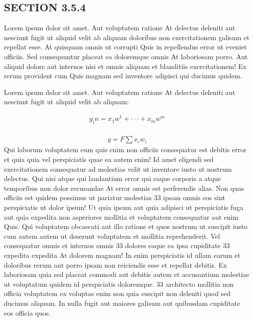 \documentclass[a4paper,12pt]{report}
\begin{document}
\subsection{SECTION 3.5.4}
\hspace{.5cm} Lorem ipsum dolor sit amet. Aut voluptatem ratione At delectus deleniti aut nesciunt fugit ut aliquid velit ab aliquam doloribus non exercitationem galisum et repellat esse. At quisquam omnis ut corrupti Quis in repellendus error ut eveniet officiis. Sed consequuntur placeat ea doloremque omnis At laboriosam porro. Aut aliquid dolore aut internos nisi et omnis aliquam et blanditiis exercitationem! Ex rerum provident cum Quis magnam sed inventore adipisci qui ducimus quidem. \par

Lorem ipsum dolor sit amet. Aut voluptatem ratione At delectus deleniti aut nesciunt fugit ut aliquid velit ab aliquam:

\begin{equation}
\begin{split}
y_in=x_1w^1+\cdot\cdot\cdot+x_mw^m
 \end{split}
\end{equation}
 
  \begin{equation}
\begin{split}
y=F \sum x_iw_i
 \end{split}
\end{equation}
Qui laborum voluptatem eum quis enim non officiis consequatur est debitis error et quia quia vel perspiciatis quae ea autem enim! Id amet eligendi sed exercitationem consequatur ad molestias velit ut inventore iusto ut nostrum delectus. Qui nisi atque qui laudantium error qui eaque corporis a atque temporibus non dolor recusandae At error omnis est perferendis alias. Non quas officiis est quidem possimus ut pariatur molestias 33 ipsam omnis eos sint perspiciatis ut dolor ipsum! Ut quia ipsum aut quia adipisci ut perspiciatis fuga aut quia expedita non asperiores mollitia et voluptatem consequatur aut enim Quis. Qui voluptatem obcaecati aut illo ratione et quos nostrum ut suscipit iusto cum autem autem ut deserunt voluptatem et mollitia reprehenderit. Vel consequatur omnis et internos omnis 33 dolores eaque ea ipsa cupiditate 33 expedita expedita At dolorem magnam! In enim perspiciatis id ullam earum et doloribus rerum aut porro ipsam non reiciendis esse et repellat debitis. Ex laboriosam quia sed placeat commodi aut debitis autem et accusantium molestiae ut voluptatum quidem id perspiciatis doloremque. 33 architecto mollitia non officia voluptatem ex voluptas enim non quia suscipit non deleniti quod sed ducimus aliquam. In nulla fugit aut maiores galisum aut quibusdam cupiditate eos officia quos.\par
\end{document}
